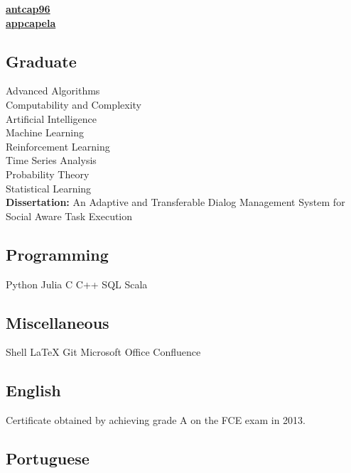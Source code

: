 \documentclass[a4paper]{MagicalCV}
\begin{document}
\begin{minipage}[t]{0.35\textwidth} 


 \href{https://github.com/antcap96}{\bf antcap96} \\
 \href{https://www.linkedin.com/in/appcapela/}{\bf appcapela}
\sectionsep


\subsection{Graduate}
Advanced Algorithms \\
Computability and Complexity \\
Artificial Intelligence \\
Machine Learning \\
Reinforcement Learning \\
Time Series Analysis \\
Probability Theory \\
Statistical Learning \\
\textbf{Dissertation: }
An Adaptive and Transferable Dialog Management System for Social Aware Task Execution \cite{capela2019adaptive}
\sectionsep


\subsection{Programming}
Python \textbullet{}
Julia \textbullet{}
C \textbullet{}
C++ \textbullet{}
SQL \textbullet{}
Scala
\sectionsep
\subsection{Miscellaneous}
Shell \textbullet{}
LaTeX \textbullet{}
Git \textbullet{}
Microsoft Office \textbullet{}
Confluence


\subsection{English}
\vspace{\topsep} %
Certificate obtained by achieving grade A on the FCE exam in 2013.
\sectionsep

\subsection{Portuguese}
\vspace{\topsep} %
\sectionsep


 \\

\end{minipage} 
\end{document}
